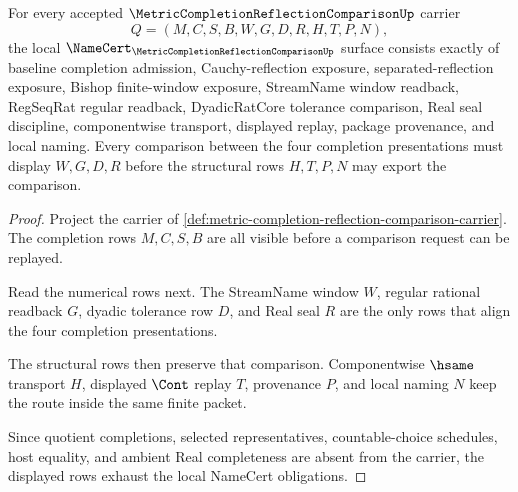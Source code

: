 \begin{theorem}
\label{thm:metric-completion-reflection-comparison-obligations}
For every accepted $\MetricCompletionReflectionComparisonUp$ carrier
$$
Q=(M,C,S,B,W,G,D,R,H,T,P,N),
$$
the local $\NameCert_{\MetricCompletionReflectionComparisonUp}$ surface consists exactly of baseline completion admission, Cauchy-reflection exposure, separated-reflection exposure, Bishop finite-window exposure, StreamName window readback, RegSeqRat regular readback, DyadicRatCore tolerance comparison, Real seal discipline, componentwise transport, displayed replay, package provenance, and local naming. Every comparison between the four completion presentations must display $W,G,D,R$ before the structural rows $H,T,P,N$ may export the comparison.
\end{theorem}
\begin{proof}
Project the carrier of \autoref{def:metric-completion-reflection-comparison-carrier}. The completion rows $M,C,S,B$ are all visible before a comparison request can be replayed.

Read the numerical rows next. The StreamName window $W$, regular rational readback $G$, dyadic tolerance row $D$, and Real seal $R$ are the only rows that align the four completion presentations.

The structural rows then preserve that comparison. Componentwise $\hsame$ transport $H$, displayed $\Cont$ replay $T$, provenance $P$, and local naming $N$ keep the route inside the same finite packet.

Since quotient completions, selected representatives, countable-choice schedules, host equality, and ambient Real completeness are absent from the carrier, the displayed rows exhaust the local NameCert obligations.
\end{proof}

